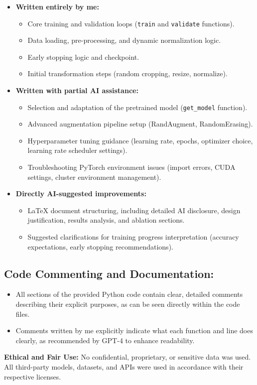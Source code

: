 \documentclass{article}
\begin{document}
\begin{itemize}
    \item \textbf{Written entirely by me:}
    \begin{itemize}
        \item Core training and validation loops (\texttt{train} and \texttt{validate} functions).
        \item Data loading, pre-processing, and dynamic normalization logic.
        \item Early stopping logic and checkpoint.      
        \item Initial transformation steps (random cropping, resize, normalize).
    \end{itemize}
    
    \item \textbf{Written with partial AI assistance:}
    \begin{itemize}
        \item Selection and adaptation of the pretrained model (\texttt{get\_model} function).
        \item Advanced augmentation pipeline setup (RandAugment, RandomErasing).
        \item Hyperparameter tuning guidance (learning rate, epochs, optimizer choice, learning rate scheduler settings).
        \item Troubleshooting PyTorch environment issues (import errors, CUDA settings, cluster environment management).
    \end{itemize}

    \item \textbf{Directly AI-suggested improvements:}
    \begin{itemize}
        \item LaTeX document structuring, including detailed AI disclosure, design justification, results analysis, and ablation sections.
        \item Suggested clarifications for training progress interpretation (accuracy expectations, early stopping recommendations).
    \end{itemize}
\end{itemize}

\subsection*{Code Commenting and Documentation:}
\begin{itemize}
    \item All sections of the provided Python code contain clear, detailed comments describing their explicit purposes, as can be seen directly within the code files.
    \item Comments written by me explicitly indicate what each function and line does clearly, as recommended by GPT-4 to enhance readability.
\end{itemize}
    \textbf{Ethical and Fair Use:} No confidential, proprietary, or sensitive data was used. All third-party models, datasets, and APIs were used in accordance with their respective licenses.
\end{document}
